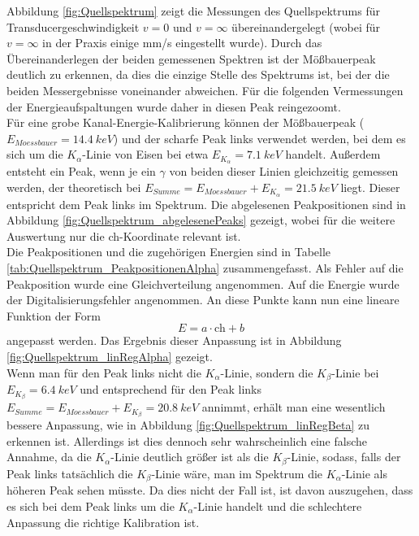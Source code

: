 \documentclass[12pt,a4paper]{article}
\begin{document}
Abbildung \ref{fig:Quellspektrum} zeigt die Messungen des Quellspektrums für Transducergeschwindigkeit $v = 0$ und $v = \infty$ übereinandergelegt (wobei für $v = \infty$ in der Praxis einige mm/s eingestellt wurde). Durch das Übereinanderlegen der beiden gemessenen Spektren ist der Mößbauerpeak deutlich zu erkennen, da dies die einzige Stelle des Spektrums ist, bei der die beiden Messergebnisse voneinander abweichen. Für die folgenden Vermessungen der Energieaufspaltungen wurde daher in diesen Peak reingezoomt.\\
Für eine grobe Kanal-Energie-Kalibrierung können der Mößbauerpeak ($E_{Moessbauer} = \SI{14,4}{keV}$) und der scharfe Peak links verwendet werden, bei dem es sich um die $K_{\alpha}$-Linie von Eisen bei etwa $E_{K_{\alpha}} = \SI{7,1}{keV}$ handelt. Außerdem entsteht ein Peak, wenn je ein $\gamma$ von beiden dieser Linien gleichzeitig gemessen werden, der theoretisch bei $E_{Summe} = E_{Moessbauer} + E_{K_{\alpha}} = \SI{21,5}{keV}$  liegt. Dieser entspricht dem Peak links im Spektrum. Die abgelesenen Peakpositionen sind in Abbildung \ref{fig:Quellspektrum_abgelesenePeaks} gezeigt, wobei für die weitere Auswertung nur die ch-Koordinate relevant ist. \\
Die Peakpositionen und die zugehörigen Energien sind in Tabelle \ref{tab:Quellspektrum_PeakpositionenAlpha} zusammengefasst. Als Fehler auf die Peakposition wurde eine Gleichverteilung angenommen. Auf die Energie wurde der Digitalisierungsfehler angenommen. An diese Punkte kann nun eine lineare Funktion der Form
\begin{equation*}
E = a \cdot \textrm{ch} + b
\end{equation*}
angepasst werden. Das Ergebnis dieser Anpassung ist in Abbildung \ref{fig:Quellspektrum_linRegAlpha} gezeigt.\\
Wenn man für den Peak links nicht die $K_{\alpha}$-Linie, sondern die $K_{\beta}$-Linie bei $E_{K_{\beta}} = \SI{6,4}{keV}$ und entsprechend für den Peak links $E_{Summe} = E_{Moessbauer} + E_{K_{\beta}} = \SI{20,8}{keV}$ annimmt, erhält man eine wesentlich bessere Anpassung, wie in Abbildung \ref{fig:Quellspektrum_linRegBeta} zu erkennen ist. Allerdings ist dies dennoch sehr wahrscheinlich eine falsche Annahme, da die $K_{\alpha}$-Linie deutlich größer ist als die $K_{\beta}$-Linie, sodass, falls der Peak links tatsächlich die $K_{\beta}$-Linie wäre, man im Spektrum die $K_{\alpha}$-Linie als höheren Peak sehen müsste. Da dies nicht der Fall ist, ist davon auszugehen, dass es sich bei dem Peak links um die $K_{\alpha}$-Linie handelt und die schlechtere Anpassung die richtige Kalibration ist.
\end{document}
